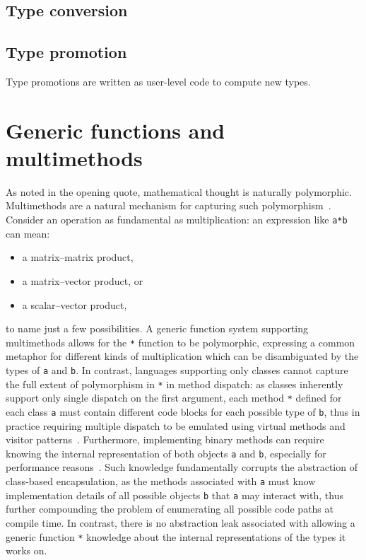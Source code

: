 \documentclass[pldi]{sigplanconf-pldi15}
\begin{document}
\subsection{Type conversion}



\subsection{Type promotion}

Type promotions are written as user-level code to compute new types.






\section{Generic functions and multimethods}

As \cite{Poincare1908} noted in the opening quote, mathematical thought is
naturally polymorphic. Multimethods are a natural mechanism for capturing such
polymorphism~\cite{Bezanson2014b,Chen2014}. Consider an operation as
fundamental as multiplication: an expression like \verb|a*b| can mean:

\begin{itemize}
	\item a matrix--matrix product,
	\item a matrix--vector product, or
	\item a scalar--vector product,
\end{itemize}
%
to name just a few possibilities. A generic function system supporting
multimethods allows for the \verb|*| function to be polymorphic, expressing a
common metaphor for different kinds of multiplication which can be
disambiguated by the types of \verb|a| and \verb|b|. In contrast, languages
supporting only classes cannot capture the full extent of polymorphism in
\verb|*| in method dispatch: as classes inherently support only single dispatch
on the first argument, each method \verb|*| defined for each class \verb|a|
must contain different code blocks for each possible type of \verb|b|, thus in
practice requiring multiple dispatch to be emulated using virtual methods and
visitor patterns~\cite{designpatterns}. Furthermore, implementing binary methods can
require knowing the internal representation of both objects \verb|a| and
\verb|b|, especially for performance reasons~\cite{Bruce1995}. Such knowledge
fundamentally corrupts the abstraction of class-based encapsulation, as the
methods associated with \verb|a| must know implementation details of all
possible objects \verb|b| that \verb|a| may interact with, thus further
compounding the problem of enumerating all possible code paths at compile time.
In contrast, there is no abstraction leak associated with allowing a generic
function \verb|*| knowledge about the internal representations of the types it
works on.
\end{document}
